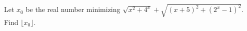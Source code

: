 Let $x_0$ be the real number minimizing $\sqrt{x^2+4^x}+\sqrt{(x+5)^2+(2^x-1)^2}$. Find $\lfloor x_0\rfloor$.
